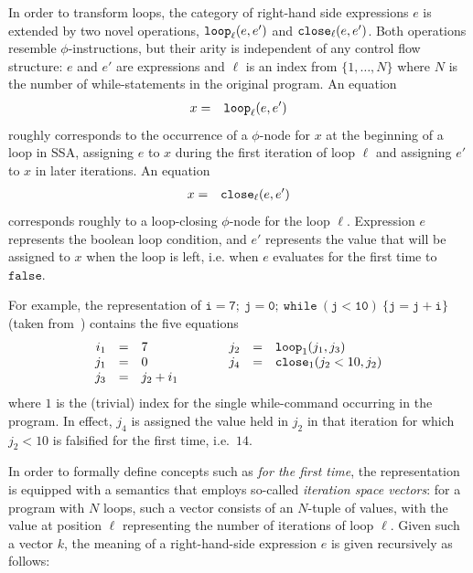 In order to transform loops, the category of right-hand side
expressions $e$ is extended by two novel operations, $\mathtt{loop}_{{\ell}}({e},{e'})$ and $\mathtt{close}_{{\ell}}({e},{e'})$.
Both operations resemble $\phi$-instructions, but their arity is
independent of any control flow structure: $e$ and $e'$ are
expressions and $\ell$ is an index from $\{1,\ldots,N\}$ where $N$ is
the number of while-statements in the original program.  An equation
\begin{eqnarray*}
x & = & \mathtt{loop}_{{\ell}}({e},{e'})
\end{eqnarray*}
roughly corresponds to the occurrence of a $\phi$-node for $x$ at the
beginning of a loop in SSA, assigning $e$ to $x$ during the first
iteration of loop $\ell$ and assigning $e'$ to $x$ in later
iterations.
An equation 
\begin{eqnarray*}
x & = & \mathtt{close}_{{\ell}}({e},{e'})
\end{eqnarray*}
corresponds roughly to a loop-closing $\phi$-node for the loop
$\ell$. Expression $e$ represents the boolean loop condition, and $e'$
represents the value that will be assigned to $x$ when the loop is
left, i.e. when $e$ evaluates for the first time to $\mathtt{false}$.

For example, the representation of
$\mathtt{i=7;\ j=0;\ while\ (j<10)\ \{j=j+i\}}$
(taken from~\cite{PopJS2007}) contains the five equations
$$
\begin{array}{rclcrcl}
i_1 & = & 7 & \qquad & j_2 & = & \mathtt{loop}_{{1}}({j_1},{j_3})\\
j_1 & = & 0 & & j_4 & = & \mathtt{close}_{{1}}({j_2 < 10},{j_2})\\
j_3 & = & j_2 + i_1
\end{array} 
$$ 
where $1$ is the (trivial) index for the single while-command
occurring in the program.  In effect, $j_4$ is assigned the value held
in $j_2$ in that iteration for which $j_2 < 10$ is falsified for the
first time, i.e.~$14$.

In order to formally define concepts such as \emph{for the first
time}, the representation is equipped with a semantics that employs
so-called
\emph{iteration space vectors}: for a program with $N$ loops, such
a vector consists of an $N$-tuple of values, with the value at
position $\ell$ representing the number of iterations of loop $\ell$.
Given such a vector $k$, the meaning of a right-hand-side expression
$e$ is given recursively as follows:

